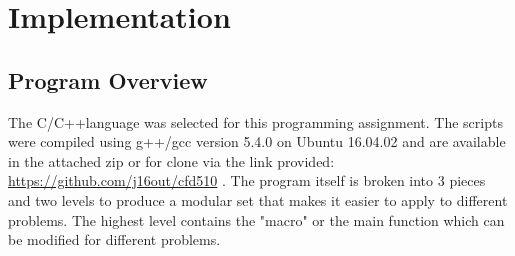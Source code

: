 \documentclass[paper=a4, fontsize=11pt, abstract=on]{scrartcl}
\numberwithin{equation}{section}		%
\numberwithin{figure}{section}			%
\numberwithin{table}{section}				%
\begin{document}
\section{Implementation}
\subsection{Program Overview}
The C/C++language was selected for this programming assignment. The scripts were compiled using g++/gcc version 5.4.0 on Ubuntu 16.04.02 and are available in the attached zip or for clone via the link provided: \url{https://github.com/j16out/cfd510} . The program itself is broken into 3 pieces and two levels to produce a modular set that makes it easier to apply to different problems. The highest level contains the "macro" or the main function which can be modified for different problems. 
\end{document}
